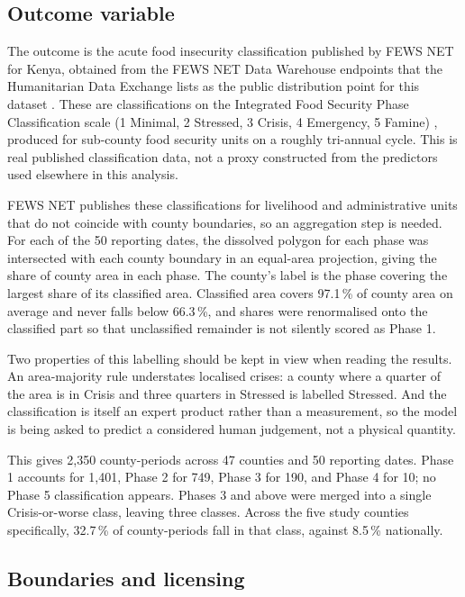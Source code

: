 \documentclass[11pt]{article}
\begin{document}
\subsection{Outcome variable}

The outcome is the acute food insecurity classification published by FEWS NET
for Kenya, obtained from the FEWS NET Data Warehouse endpoints that the
Humanitarian Data Exchange lists as the public distribution point for this
dataset \cite{fewsnetke}. These are classifications on the Integrated Food
Security Phase Classification scale (1 Minimal, 2 Stressed, 3 Crisis, 4
Emergency, 5 Famine) \cite{ipc2021}, produced for sub-county food security
units on a roughly tri-annual cycle. This is real published classification data,
not a proxy constructed from the predictors used elsewhere in this analysis.

FEWS NET publishes these classifications for livelihood and administrative units
that do not coincide with county boundaries, so an aggregation step is needed.
For each of the 50 reporting dates, the dissolved polygon for each phase was
intersected with each county boundary in an equal-area projection, giving the
share of county area in each phase. The county's label is the phase covering the
largest share of its classified area. Classified area covers 97.1\,\% of county
area on average and never falls below 66.3\,\%, and shares were renormalised onto
the classified part so that unclassified remainder is not silently scored as
Phase 1.

Two properties of this labelling should be kept in view when reading the
results. An area-majority rule understates localised crises: a county where a
quarter of the area is in Crisis and three quarters in Stressed is labelled
Stressed. And the classification is itself an expert product rather than a
measurement, so the model is being asked to predict a considered human judgement,
not a physical quantity.

This gives 2,350 county-periods across 47 counties and 50 reporting dates.
Phase 1 accounts for 1,401, Phase 2 for 749, Phase 3 for 190, and Phase 4 for 10;
no Phase 5 classification appears. Phases 3 and above were merged into a single
Crisis-or-worse class, leaving three classes. Across the five study counties
specifically, 32.7\,\% of county-periods fall in that class, against 8.5\,\%
nationally.

\subsection{Boundaries and licensing}
\end{document}
